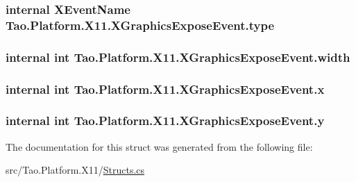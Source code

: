 \label{struct_tao_1_1_platform_1_1_x11_1_1_x_graphics_expose_event_a02b3f7de9b3208709f02424c6ff9b6e7}
\hypertarget{struct_tao_1_1_platform_1_1_x11_1_1_x_graphics_expose_event_a33c93862f0fc4a6c7324c6a89e944610}{
\subsubsection[{type}]{\setlength{\rightskip}{0pt plus 5cm}internal {\bf XEventName} {\bf Tao.Platform.X11.XGraphicsExposeEvent.type}}}
\label{struct_tao_1_1_platform_1_1_x11_1_1_x_graphics_expose_event_a33c93862f0fc4a6c7324c6a89e944610}
\hypertarget{struct_tao_1_1_platform_1_1_x11_1_1_x_graphics_expose_event_a0cc6dc70a41720ef1fcf15cf1a9d21e0}{
\subsubsection[{width}]{\setlength{\rightskip}{0pt plus 5cm}internal int {\bf Tao.Platform.X11.XGraphicsExposeEvent.width}}}
\label{struct_tao_1_1_platform_1_1_x11_1_1_x_graphics_expose_event_a0cc6dc70a41720ef1fcf15cf1a9d21e0}
\hypertarget{struct_tao_1_1_platform_1_1_x11_1_1_x_graphics_expose_event_af57a3dae62d2b2ee1e031a89d9c8ab04}{
\subsubsection[{x}]{\setlength{\rightskip}{0pt plus 5cm}internal int {\bf Tao.Platform.X11.XGraphicsExposeEvent.x}}}
\label{struct_tao_1_1_platform_1_1_x11_1_1_x_graphics_expose_event_af57a3dae62d2b2ee1e031a89d9c8ab04}
\hypertarget{struct_tao_1_1_platform_1_1_x11_1_1_x_graphics_expose_event_a363a405f45a91c13f7dae3ffe1f43c79}{
\subsubsection[{y}]{\setlength{\rightskip}{0pt plus 5cm}internal int {\bf Tao.Platform.X11.XGraphicsExposeEvent.y}}}
\label{struct_tao_1_1_platform_1_1_x11_1_1_x_graphics_expose_event_a363a405f45a91c13f7dae3ffe1f43c79}


The documentation for this struct was generated from the following file:\begin{DoxyCompactItemize}
\item 
src/Tao.Platform.X11/\hyperlink{_structs_8cs}{Structs.cs}\end{DoxyCompactItemize}
